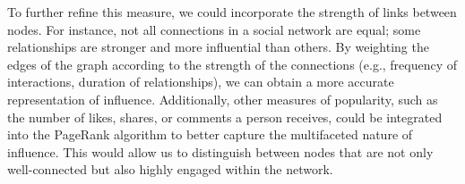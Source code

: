 \documentclass{article}
\begin{document}
\begin{enumerate}
    To further refine this measure, we could incorporate the strength of links between nodes. For instance, not all connections in a social network are equal; some relationships are stronger and more influential than others. By weighting the edges of the graph according to the strength of the connections (e.g., frequency of interactions, duration of relationships), we can obtain a more accurate representation of influence. Additionally, other measures of popularity, such as the number of likes, shares, or comments a person receives, could be integrated into the PageRank algorithm to better capture the multifaceted nature of influence. This would allow us to distinguish between nodes that are not only well-connected but also highly engaged within the network.

\end{enumerate}
\end{document}
